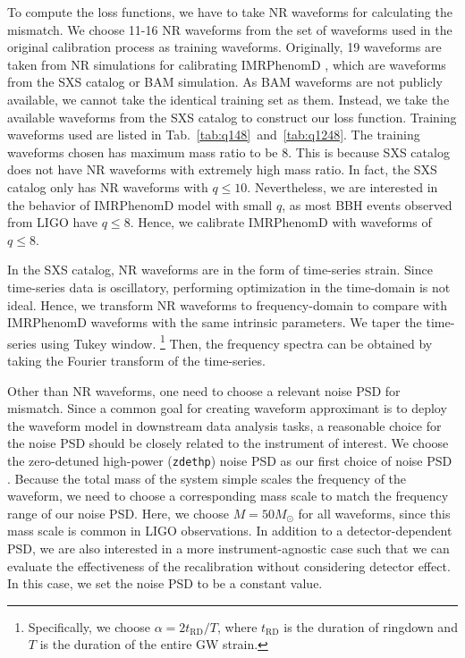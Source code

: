 \documentclass[twocolumn]{aastex631}
\newcommand{\zdethp}{\texttt{zdethp}}
\begin{document}
To compute the loss functions, we have to take NR waveforms for calculating the mismatch. We choose 11-16 NR waveforms from the set of waveforms used in the original
calibration process as training waveforms. Originally, 19 waveforms are taken from 
NR simulations for calibrating IMRPhenomD \citep{khan2016frequency}, 
which are waveforms from the SXS catalog \citep{boyle2019sxs} or BAM simulation. 
As BAM waveforms are not publicly available, we cannot take the identical training 
set as them. Instead, we take the available waveforms from the SXS catalog to construct our loss function. Training waveforms used are listed in Tab.~\ref{tab:q148}~and~\ref{tab:q1248}. The training waveforms chosen has maximum mass ratio to be 8. This is because SXS catalog does not have NR waveforms with extremely high mass ratio. In fact, the SXS catalog only has NR waveforms with $q\leq10$. Nevertheless, we are interested in the behavior of IMRPhenomD model with small $q$, as most BBH events observed from LIGO have $q\leq8$. Hence, we calibrate IMRPhenomD with waveforms of $q\leq8$. 

In the SXS catalog, NR waveforms are in the form of time-series strain. Since time-series data is oscillatory, performing optimization in the time-domain is not ideal. Hence, we transform NR waveforms to frequency-domain to compare with IMRPhenomD waveforms with the
same intrinsic parameters. We taper the time-series using Tukey window.
\footnote{ Specifically, we choose $\alpha=2t_{\mathrm{RD}}/T$, where
	$t_{\mathrm{RD}}$ is the duration of ringdown and $T$ is the duration of the
	entire GW strain. } 
Then, the frequency spectra can be obtained by taking the Fourier transform of the time-series.

Other than NR waveforms, one need to choose a relevant noise PSD for 
mismatch. Since a common goal for creating waveform approximant is to
deploy the waveform model in downstream data analysis tasks, a reasonable choice
for the noise PSD should be closely related to the instrument of interest. We
choose the zero-detuned high-power (\zdethp) noise PSD as our
first choice of noise PSD \citep{aasi2015advanced}. Because the total mass of the system simple scales
the frequency of the waveform, we need to choose a corresponding mass scale to
match the frequency range of our noise PSD. Here, we choose $M=50M_{\odot}$ for
all waveforms, since this mass scale is common in LIGO observations. In addition
to a detector-dependent PSD, we are also interested in a more
instrument-agnostic case such that we can evaluate the effectiveness of the
recalibration without considering detector effect. In this case, we set the
noise PSD to be a constant value. 
\end{document}
